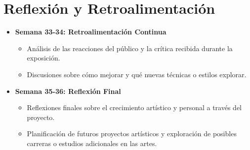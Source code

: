\newpage
\section{Reflexión y Retroalimentación}
\begin{itemize}
  \item \textbf{Semana 33-34: Retroalimentación Continua}
  \begin{itemize}
    \item Análisis de las reacciones del público y la crítica recibida durante la exposición.
    \item Discusiones sobre cómo mejorar y qué nuevas técnicas o estilos explorar.
  \end{itemize}
  \item \textbf{Semana 35-36: Reflexión Final}
  \begin{itemize}
    \item Reflexiones finales sobre el crecimiento artístico y personal a través del proyecto.
    \item Planificación de futuros proyectos artísticos y exploración de posibles carreras o estudios adicionales en las artes.
  \end{itemize}
\end{itemize}

